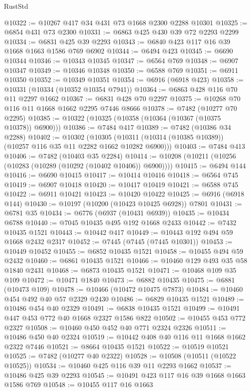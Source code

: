 \begin{lexlean}{RustStd}
\begin{coremodule}
@10322 := @10267 @417 @34 @431 @73 @1668 @2300 @2288 @10301
@10325 := @6854 @431 @73 @2300
@10331 := @6863 @425 @430 @39 @72 @2293 @2299
@10334 := @6831 @425 @39 @2293
@10343 := @6840 @423 @117 @16 @39 @1668 @1663 @1586 @769 @6902
@10344 := @6494 @423
@10345 := @6690 @10344
@10346 := @10343 @10345
@10347 := @6564 @769
@10348 := @6907 @10347
@10349 := @10346 @10348
@10350 := @6588 @769
@10351 := @6911 @10350
@10352 := @10349 @10351
@10354 := @6916 (@6918 @423)
@10358 := @10331 (@10334 (@10352 @10354 @7941))
@10364 := @6863 @428 @116 @70 @11 @2297 @1662
@10367 := @6831 @428 @70 @2297
@10375 := @10268 @70 @116 @11 @1668 @1662 @2295 @7446 @8666
@10378 := @7482 (@10277 @70 @2295)
@10385 := @10322 (@10325 (@10358 (@10364 (@10367 (@10375 @10378)) @6900)))
@10386 := @7484 @417
@10389 := @7482 (@10386 @34 @2288)
@10402 := @10302
    (@10305 (@10311 (@10314 (@10385 @10389)) (@10257 @116 @35 @11 @2282 @1662 @10282 @6900)))
@10403 := @7484 @413
@10406 := @7482 (@10403 @35 @2284)
@10414 := @10208 (@10211 (@10256 (@10283 (@10289 (@10292 (@10402 @10406)) @6900))))
@10415 := @6494 @144
@10416 := @6690 @10415
@10417 := @10414 @10416
@10418 := @6564 @745
@10419 := @6907 @10418
@10420 := @10417 @10419
@10421 := @6588 @745
@10422 := @6911 @10421
@10423 := @10420 @10422
@10425 := @6916 (@6918 @144)
@10430 := @10197 (@10200 (@10423 @10425 @6928)) @7801
@10431 := @6781 @35
@10434 := @6776 (@6937 (@10431 @6939))
@10435 := @10434 @6788
@10440 := @7045 @10435 @495 @192 @1668 @2433
@10442 := @7432 @10435 @1521
@10443 := @10442 @417
@10449 := @10443 @192 @494 @59 @1668 @2432 @2317
@10452 := @7445 (@7445 (@7445 @10301))
@10453 := @10449 @10452
@10455 := @6852 @10435 @1521
@10458 := @10455 @494 @59 @2432
@10460 := @6861 @10435 @1521
@10466 := @10460 @129 @493 @35 @58 @1840 @2431
@10468 := @6873 @10435 @1521
@10471 := @10468 @109 @35 @109
@10472 := @10471 @1840
@10473 := @6882 @10435
@10475 := @6881 (@10473 @109)
@10478 := @10466 (@10472 @10475 @7873)
@10484 := @10460 @454 @492 @40 @57 @2329 @2430
@10486 := @6829 @10435 @1521
@10489 := @10486 @454 @40 @2329
@10491 := @6838 @10435 @1521
@10499 := @10491 @447 @453 @772 @40 @1668 @2327 @1586 @822
@10502 := @10455 @453 @772 @2327
@10508 := @10460 @450 @452 @40 @771 @2324 @2326
@10511 := @10486 @450 @40 @2324
@10519 := @10442 @408 @40 @116 @11 @1668 @1662 @2322 @7446
@10521 := @8664 @10435 @1521
@10522 := @10519 @10521
@10525 := @7482 (@10277 @40 @2322)
@10528 := @10508 (@10511 (@10522 @10525))
@10534 := @10460 @425 @116 @39 @11 @2293 @1662
@10537 := @10486 @425 @39 @2293
@10545 := @10491 @423 @117 @16 @39 @1668 @1663 @1586 @769
@10548 := @10455 @117 @16 @1663

\end{coremodule}
\end{lexlean}
